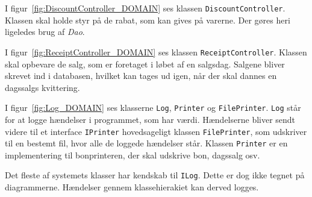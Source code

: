
I figur~\ref{fig:DiscountController_DOMAIN} ses klassen \texttt{DiscountController}. Klassen skal holde styr på de rabat, som kan gives på varerne. Der gøres heri ligeledes brug af \textit{Dao}.


I figur~\ref{fig:ReceiptController_DOMAIN} ses klassen \texttt{ReceiptController}. Klassen skal opbevare de salg, som er foretaget i løbet af en salgsdag. Salgene bliver skrevet ind i databasen, hvilket kan tages ud igen, når der skal dannes en dagssalgs kvittering.


I figur~\ref{fig:Log_DOMAIN} ses klasserne \texttt{Log}, \texttt{Printer} og \texttt{FilePrinter}. \texttt{Log} står for at logge hændelser i programmet, som har værdi. Hændelserne bliver sendt videre til et interface \texttt{IPrinter} hovedsageligt klassen \texttt{FilePrinter}, som udskriver til en bestemt fil, hvor alle de loggede hændelser står. Klassen \texttt{Printer} er en implementering til bonprinteren, der skal udskrive bon, dagssalg osv.


Det fleste af systemets klasser har kendskab til \texttt{ILog}. Dette er dog ikke tegnet på diagrammerne. Hændelser gennem klassehierakiet kan derved logges.